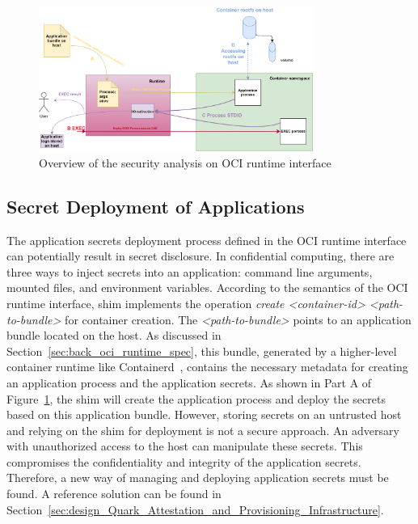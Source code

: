 \begin{figure}[htp]
  \centering
  \includegraphics[width=0.8\textwidth]{images/security_analysis.png}
  \caption[Overview of the security analysis on OCI runtime interface]{Overview of the security analysis on OCI runtime interface}
  \label{fig:security_analysis}
\end{figure}


\subsection{Secret Deployment of Applications}
The application secrets deployment process defined in the OCI runtime interface can potentially result in secret disclosure. In confidential computing, there are three ways to inject secrets into an application: command line arguments, mounted files, and environment variables. According to the semantics of the OCI runtime interface, shim implements the operation 
\emph{create <container-id> <path-to-bundle>} for container creation. The \emph{<path-to-bundle>} points to an application bundle located on the host. As discussed in Section~\ref{sec:back_oci_runtime_spec}, this bundle, generated by a higher-level container runtime like Containerd~\cite*{containerd}, contains the necessary metadata for creating an 
application process and the application secrets. As shown in Part A of Figure~\ref{fig:security_analysis}, the shim will create the application process and deploy the secrets based on this application bundle. However, storing secrets on an untrusted host and relying on the shim for deployment is not a secure approach. An adversary with unauthorized access 
to the host can manipulate these secrets. This compromises the confidentiality and integrity of the application secrets. Therefore, a new way of managing and deploying application secrets must be found. A reference solution can be found in Section~\ref{sec:design_Quark_Attestation_and_Provisioning_Infrastructure}.

